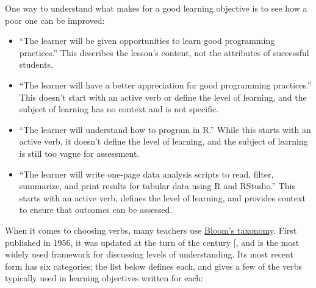 One way to understand what makes for a good learning objective is to
see how a poor one can be improved:

\begin{itemize}
\item
  ``The learner will be given opportunities to learn good programming
  practices.'' This describes the lesson's content, not the attributes
  of successful students.
\item
  ``The learner will have a better appreciation for good programming
  practices.'' This doesn't start with an active verb or define the
  level of learning, and the subject of learning has no context and is
  not specific.
\item
  ``The learner will understand how to program in R.'' While this starts
  with an active verb, it doesn't define the level of learning, and
  the subject of learning is still too vague for assessment.
\item
  ``The learner will write one-page data analysis scripts to read,
  filter, summarize, and print results for tabular data using R and
  RStudio.'' This starts with an active verb, defines the level of
  learning, and provides context to ensure that outcomes can be
  assessed.
\end{itemize}

When it comes to choosing verbs, many teachers use \protect\hyperlink{g:blooms-taxonomy}{Bloom's
taxonomy}. First published in 1956, it
was updated at the turn of the century {[}\protect[\hyperlink{b:Ande2001}{Ande2001}]{]}, and is the
most widely used framework for discussing levels of understanding. Its
most recent form has six categories; the list below defines each, and
gives a few of the verbs typically used in learning objectives written
for each:


